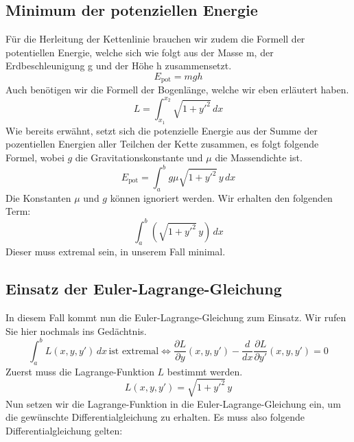 \subsection{Minimum der potenziellen Energie
\label{kettenlinie:subsection:Minimum der potenziellen Energie}}
Für die Herleitung der Kettenlinie brauchen wir zudem die Formell der potentiellen Energie, welche sich wie folgt aus der Masse m, der Erdbeschleunigung g und der Höhe h zusammensetzt.
\[
	E_{\text{pot}}
	=
	mgh
\]
Auch benötigen wir die Formell der Bogenlänge, welche wir eben erläutert haben.
\[
	L
	=
	\int_{x_1}^{x_2} \sqrt{1 + y'^2} \, dx
\]
Wie bereits erwähnt, setzt sich die potenzielle Energie aus der Summe der pozentiellen Energien aller Teilchen der Kette zusammen, es folgt folgende Formel, wobei \(g\) die Gravitationskonstante und \(\mu\) die Massendichte ist.
\[
	E_{\text{pot}}
	=
	\int_{a}^{b} g \mu \sqrt{1 + y'^2} \, y \, dx
\]
Die Konstanten \(\mu\) und \(g\) können ignoriert werden.
Wir erhalten den folgenden Term:
\[
	\int_{a}^{b} (\sqrt{1 + y'^2} \, y) \, dx
\]
Dieser muss extremal sein, in unserem Fall minimal.

\subsection{Einsatz der Euler-Lagrange-Gleichung
\label{kettenlinie:subsection:Einsatz der Euler-Lagrange-Gleichung}}
In diesem Fall kommt nun die Euler-Lagrange-Gleichung zum Einsatz. Wir rufen Sie hier nochmals ins Gedächtnis.
\[
	\int_{a}^{b} L(x, y, y') \, dx \, \text{ist extremal} \iff \frac{\partial L}{\partial y}(x, y, y') - \frac{d}{dx} \frac{\partial L}{\partial y'}(x, y, y') = 0
\]
Zuerst muss die Lagrange-Funktion \(L\) bestimmt werden.
\[
	L(x, y, y')
	=
	\sqrt{1 + y'^2} \, y
\]
Nun setzen wir die Lagrange-Funktion in die Euler-Lagrange-Gleichung ein, um die gewünschte Differentialgleichung zu erhalten. Es muss also folgende Differentialgleichung gelten:


